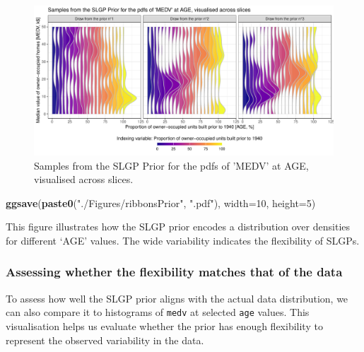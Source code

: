 \documentclass[
]{article}
\newenvironment{Shaded}{\begin{snugshade}}{\end{snugshade}}
\newcommand{\AttributeTok}[1]{\textcolor[rgb]{0.13,0.29,0.53}{#1}}
\newcommand{\DecValTok}[1]{\textcolor[rgb]{0.00,0.00,0.81}{#1}}
\newcommand{\FunctionTok}[1]{\textcolor[rgb]{0.13,0.29,0.53}{\textbf{#1}}}
\newcommand{\NormalTok}[1]{#1}
\newcommand{\StringTok}[1]{\textcolor[rgb]{0.31,0.60,0.02}{#1}}
\begin{document}
\begin{figure}[H]

{\centering \includegraphics{IntroductionSLGP_files/figure-latex/SLGPplottingPrior1-1} 

}

\caption{Samples from the SLGP Prior for the pdfs of 'MEDV' at AGE, visualised across slices.}\label{fig:SLGPplottingPrior1}
\end{figure}

\begin{Shaded}
\begin{Highlighting}[]
\FunctionTok{ggsave}\NormalTok{(}\FunctionTok{paste0}\NormalTok{(}\StringTok{"./Figures/ribbonsPrior"}\NormalTok{,  }\StringTok{".pdf"}\NormalTok{), }\AttributeTok{width=}\DecValTok{10}\NormalTok{, }\AttributeTok{height=}\DecValTok{5}\NormalTok{)}
\end{Highlighting}
\end{Shaded}

This figure illustrates how the SLGP prior encodes a distribution over densities for different `AGE' values. The wide variability indicates the flexibility of SLGPs.

\subsubsection{Assessing whether the flexibility matches that of the data}\label{assessing-whether-the-flexibility-matches-that-of-the-data}

To assess how well the SLGP prior aligns with the actual data distribution, we can also compare it to histograms of \texttt{medv} at selected \texttt{age} values. This visualisation helps us evaluate whether the prior has enough flexibility to represent the observed variability in the data.
\end{document}
